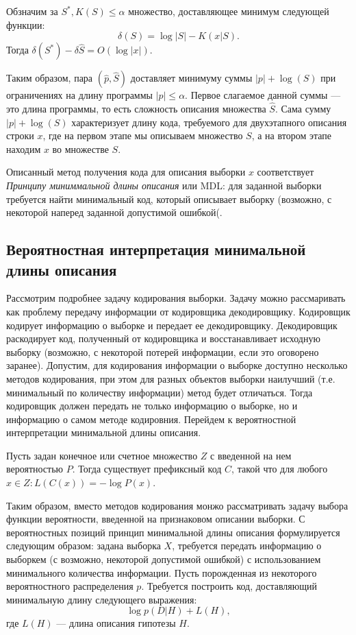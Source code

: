 \documentclass[../main.tex]{subfiles}
\begin{document}
\begin{theorembd}
Обзначим за $S^{*}, K(S) \leq \alpha$  множество, доставляющее минимум следующей функции:
\[
    \delta(S) = \log{|S|} - K(x|S).
\]
Тогда  $\delta(S^{*}) - \delta{\hat{S}} = O(\log |x|).$
\end{theorembd}

Таким образом, пара $(\hat{p}, \hat{S})$ доставляет минимуму суммы $|p| + \log(S)$ при ограничениях на длину программы $|p| \leq \alpha$. Первое слагаемое данной суммы --- это длина  программы, то есть сложность описания множества $\hat{S}$. Сама сумму $|p| + \log(S)$ характеризует длину кода, требуемого для двухэтапного описания строки $x$, где на первом этапе мы описываем множество $S$, а на втором этапе находим $x$ во множестве $S$.

Описанный метод получения кода для описания выборки $x$ соответствует \textit{Принципу миниммальной длины описания} или MDL: для заданной выборки требуется найти минимальный код, который описывает выборку (возможно, с некоторой наперед заданной допустимой ошибкой(.

\subsection{Вероятностная интерпретация минимальной длины описания}
Рассмотрим подробнее задачу кодирования выборки. Задачу можно рассмаривать как проблему передачу информации от кодировщика декодировщику. Кодировщик кодирует информацию о выборке и передает ее декодировщику. Декодировщик раскодирует код, полученный от кодировщика и восстанавливает исходную выборку (возможно, с некоторой потерей информации, если это оговорено заранее).
Допустим, для кодирования информации о выборке доступно несколько методов кодирования, при этом для разных объектов выборки наилучший (т.е. минимальный по количеству информации) метод будет отличаться. Тогда кодировщик должен передать не только информацию о выборке, но и информацию о самом методе кодировния. Перейдем к вероятностной интерпретации минимальной длины описания.

\begin{theorembd}
Пусть задан конечное или счетное множество $Z$ с введенной на нем вероятностью $P$. Тогда существует префиксный код $C$, такой что для любого $x \in Z : L(C(x)) = -\log P(x)$.
\end{theorembd}

Таким образом, вместо методов кодирования монжо рассматривать задачу выбора функции вероятности, введенной на признаковом описании выборки. 
С вероятностных позиций принцип минимальной длины описания формулируется следующим образом: задана выборка $X$, требуется передать информацию о выборкем (с возможно, некоторой допустимой ошибкой) с использованием минимального количества информации. Пусть
 порожденная из некоторого вероятностного распределения $p$. Требуется построить код, доставляющий минимальную длину следующего выражения:
\[
    \log p(D|H) + L(H), 
\]
где $L(H)$ --- длина описания гипотезы $H$. 
\end{document}
